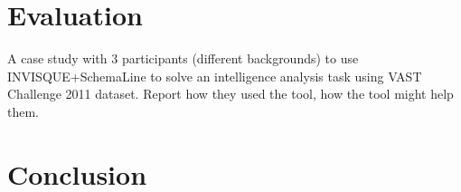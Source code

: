 \section{Evaluation}
A case study with 3 participants (different backgrounds) to use INVISQUE+SchemaLine to solve an intelligence analysis task using VAST Challenge 2011 dataset. Report how they used the tool, how the tool might help them.

\section{Conclusion}


%
%
%
%
%
%
%